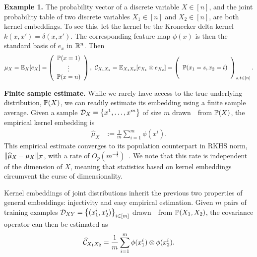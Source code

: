 \documentclass[11pt]{article}
\newcommand{\hmu}{\widehat{\mu}}
\begin{document}
{\bf Example 1.} The probability vector of a discrete variable $X \in [n]$, and the joint probability table of two discrete variables $X_1 \in [n]$ and $X_2 \in [n]$, are both kernel embeddings. To see this, let the kernel be the Kronecker delta kernel $k(x,x') = \delta(x,x')$. The corresponding feature map $\phi(x)$ is then the standard basis of $e_{x}$ in $\mathbb{R}^n$. Then
\begin{align}
    \mu_X
		= \mathbb{E}_X[e_X] = \left(
      \begin{array}{c}
         \mathbb{P}(x = 1) \cr
         \vdots \cr
         \mathbb{P}(x = n)
       \end{array}
    \right),~
		\mathcal{C}_{X_1X_2}
		= \mathbb{E}_{X_1X_2}[e_{X_1} \otimes e_{X_2}]=
		\left(
        \begin{array}{c}
            \cr
            \mathbb{P}(x_1=s,x_2=t) \cr
						\cr
        \end{array}
    \right)_{s,t \in [n]}. \label{eq:jointprobabilitytable}
\end{align}

{\bf Finite sample estimate.} While we rarely have access to the true underlying distribution, $\mathbb{P}(X)$,
we can readily estimate its embedding using a finite sample average. Given a sample $\mathcal{D}_{X} = \left\{x^1, \ldots, x^m\right\}$ of size $m$ drawn~\iid~from $\mathbb{P}(X)$, the empirical kernel embedding is
\begin{align}
    \hmu_{X} &:= \frac{1}{m} \sum\nolimits_{i=1}^m \phi(x^i). \label{eq:empirical_embedding}
\end{align}
This empirical estimate converges to its population counterpart in RKHS norm, $\|\hmu_X - \mu_X \|_{\Fcal}$, with a rate of $O_p(m^{-\frac{1}{2}})$~\cite{SmoGreSonSch07}. We note that this rate is independent of the dimension of $X$, meaning that statistics based on kernel embeddings circumvent the curse of dimensionality.

Kernel embeddings of joint distributions inherit the previous two properties of general embeddings: injectivity and easy empirical estimation. Given $m$ pairs of training examples $\mathcal{D}_{XY}=\left\{(x_1^i,x_2^i)\right\}_{i\in [m]}$ drawn~\iid~from $\mathbb{P}(X_1,X_2)$,
the covariance operator can then be estimated as
\begin{align}
 \widehat {\mathcal{C}}_{X_1X_2} =\frac{1}{m}\sum_{i=1}^m \phi(x_1^i) \otimes \phi(x_2^i). \label{eq:empirical_covariance}
\end{align}
\end{document}
